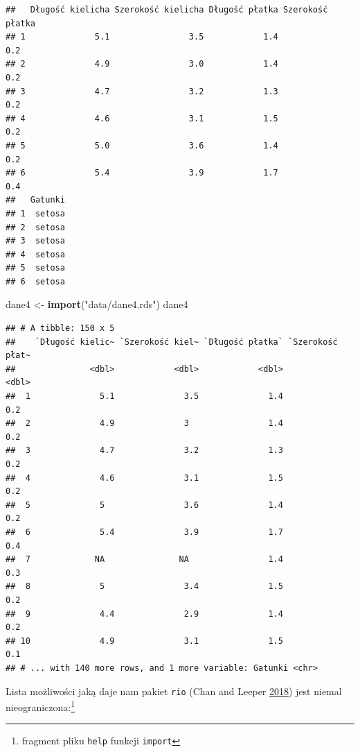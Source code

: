 \documentclass[]{book}
\newenvironment{Shaded}{\begin{snugshade}}{\end{snugshade}}
\newcommand{\KeywordTok}[1]{\textcolor[rgb]{0.13,0.29,0.53}{\textbf{#1}}}
\newcommand{\NormalTok}[1]{#1}
\newcommand{\StringTok}[1]{\textcolor[rgb]{0.31,0.60,0.02}{#1}}
\let\rmarkdownfootnote\footnote%
\def\footnote{\protect\rmarkdownfootnote}
\theoremstyle{plain}
\theoremstyle{definition}
\theoremstyle{definition}
\theoremstyle{definition}
\theoremstyle{definition}
\theoremstyle{remark}
\begin{document}
\begin{verbatim}
##   Długość kielicha Szerokość kielicha Długość płatka Szerokość płatka
## 1              5.1                3.5            1.4              0.2
## 2              4.9                3.0            1.4              0.2
## 3              4.7                3.2            1.3              0.2
## 4              4.6                3.1            1.5              0.2
## 5              5.0                3.6            1.4              0.2
## 6              5.4                3.9            1.7              0.4
##   Gatunki
## 1  setosa
## 2  setosa
## 3  setosa
## 4  setosa
## 5  setosa
## 6  setosa
\end{verbatim}

\begin{Shaded}
\begin{Highlighting}[]
\NormalTok{dane4 <-}\StringTok{ }\KeywordTok{import}\NormalTok{(}\StringTok{"data/dane4.rds"}\NormalTok{)}
\NormalTok{dane4}
\end{Highlighting}
\end{Shaded}

\begin{verbatim}
## # A tibble: 150 x 5
##    `Długość kielic~ `Szerokość kiel~ `Długość płatka` `Szerokość płat~
##               <dbl>            <dbl>            <dbl>            <dbl>
##  1              5.1              3.5              1.4              0.2
##  2              4.9              3                1.4              0.2
##  3              4.7              3.2              1.3              0.2
##  4              4.6              3.1              1.5              0.2
##  5              5                3.6              1.4              0.2
##  6              5.4              3.9              1.7              0.4
##  7             NA               NA                1.4              0.3
##  8              5                3.4              1.5              0.2
##  9              4.4              2.9              1.4              0.2
## 10              4.9              3.1              1.5              0.1
## # ... with 140 more rows, and 1 more variable: Gatunki <chr>
\end{verbatim}

Lista możliwości jaką daje nam pakiet \texttt{rio} (Chan and Leeper \protect\hyperlink{ref-R-rio}{2018}) jest niemal nieograniczona:\footnote{fragment pliku \texttt{help} funkcji \texttt{import}}
\end{document}
